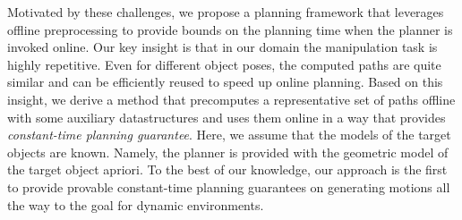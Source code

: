 \documentclass[conference]{IEEEtran}
\begin{document}
Motivated by these challenges, we propose a planning framework that leverages offline preprocessing to provide bounds on the planning time when the planner is invoked online. Our key insight is that in our domain the manipulation task is highly repetitive. Even for different object poses, the computed paths are quite similar and can be efficiently reused to speed up online planning. Based on this insight, we derive a method that precomputes a representative set of paths offline with some auxiliary datastructures and uses them online in a way that provides \emph{constant-time planning guarantee}. Here, we assume that the models of the target objects are known. Namely, the planner is provided with the geometric model of the target object apriori. To the best of our knowledge, our approach is the first to provide provable constant-time planning guarantees on generating motions all the way to the goal for dynamic environments.
\end{document}
